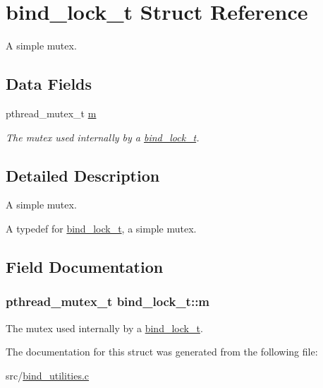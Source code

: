 \hypertarget{structbind__lock__t}{}\section{bind\+\_\+lock\+\_\+t Struct Reference}
\label{structbind__lock__t}


A simple mutex.  


\subsection*{Data Fields}
\begin{DoxyCompactItemize}
\item 
pthread\+\_\+mutex\+\_\+t \hyperlink{structbind__lock__t_a5cb6fb5ec307a3566461856177cf993e}{m}
\begin{DoxyCompactList}\small\item\em The mutex used internally by a \hyperlink{structbind__lock__t}{bind\+\_\+lock\+\_\+t}. \end{DoxyCompactList}\end{DoxyCompactItemize}


\subsection{Detailed Description}
A simple mutex. 

A typedef for \hyperlink{structbind__lock__t}{bind\+\_\+lock\+\_\+t}, a simple mutex. 

\subsection{Field Documentation}
\subsubsection[{\texorpdfstring{m}{m}}]{\setlength{\rightskip}{0pt plus 5cm}pthread\+\_\+mutex\+\_\+t bind\+\_\+lock\+\_\+t\+::m}\hypertarget{structbind__lock__t_a5cb6fb5ec307a3566461856177cf993e}{}\label{structbind__lock__t_a5cb6fb5ec307a3566461856177cf993e}


The mutex used internally by a \hyperlink{structbind__lock__t}{bind\+\_\+lock\+\_\+t}. 



The documentation for this struct was generated from the following file\+:\begin{DoxyCompactItemize}
\item 
src/\hyperlink{bind__utilities_8c}{bind\+\_\+utilities.\+c}\end{DoxyCompactItemize}
